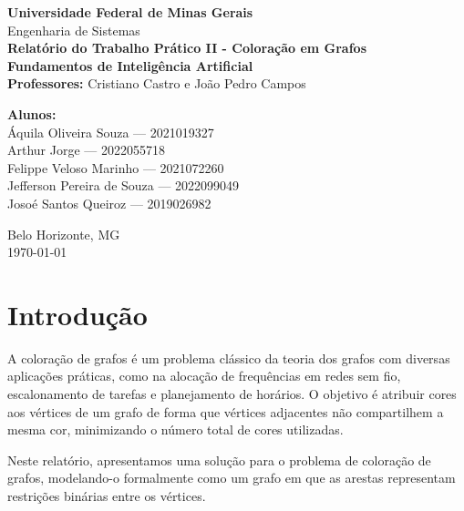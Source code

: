 \documentclass[12pt,a4paper]{article}
\begin{document}
\begin{titlepage}
    \centering
    {\Large \textbf{Universidade Federal de Minas Gerais}}\\[0.3cm]
    {\large Engenharia de Sistemas}\\[2cm]
    
    {\Huge \textbf{Relatório do Trabalho Prático II - Coloração em Grafos}}\\[1.5cm]
    
    \textbf{Fundamentos de Inteligência Artificial}\\[0.5cm]
    \textbf{Professores:} Cristiano Castro e João Pedro Campos\\[1.5cm]
    
    \begin{flushleft}
        \textbf{Alunos:}\\
        Áquila Oliveira Souza --- 2021019327\\
        Arthur Jorge --- 2022055718\\
        Felippe Veloso Marinho --- 2021072260\\
        Jefferson Pereira de Souza --- 2022099049\\
        Josoé Santos Queiroz --- 2019026982
    \end{flushleft}
    
    \vfill
    {\large Belo Horizonte, MG}\\
    {\large \today}
\end{titlepage}

\clearpage
\tableofcontents
\clearpage

\section{Introdução}
A coloração de grafos é um problema clássico da teoria dos grafos com diversas aplicações práticas, como na alocação de frequências em redes sem fio, escalonamento de tarefas e planejamento de horários. O objetivo é atribuir cores aos vértices de um grafo de forma que vértices adjacentes não compartilhem a mesma cor, minimizando o número total de cores utilizadas.

Neste relatório, apresentamos uma solução para o problema de coloração de grafos, modelando-o formalmente como um grafo em que as arestas representam restrições binárias entre os vértices. 
\end{document}
